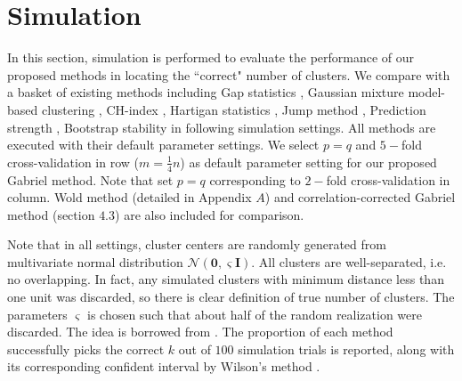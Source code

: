 \documentclass[12pt]{article}
\begin{document}
\section{Simulation}
In this section, simulation is performed to evaluate the performance of our
proposed methods in locating the ``correct" number of clusters. We compare
with a basket of existing methods including Gap statistics
\citep{tibshirani2001estimating}, Gaussian mixture model-based clustering
\citep{fraley2002model}, CH-index \citep{calinski1974dendrite}, Hartigan
statistics \citep{hartigan1975clustering}, Jump method
\citep{sugar2003finding}, Prediction strength \citep{tibshirani2005cluster},
Bootstrap stability \citep{fang2012selection} in following simulation
settings. All methods are executed with their default parameter settings. 
We select $p=q$ and $5-$fold cross-validation in row
($m=\frac{1}{4}n$) as default parameter setting for our proposed Gabriel
method. Note that set $p=q$ corresponding to $2-$fold cross-validation in
column. Wold method (detailed in Appendix $A$) and correlation-corrected 
Gabriel method (section $4.3$) are also included for comparison. 

Note that in all settings, cluster centers are randomly generated from 
multivariate normal distribution $\mathcal{N}\left(\mathbf{0},\varsigma \mathbf{I}\right)$. 
All clusters are well-separated, i.e. no overlapping. In fact, any simulated 
clusters with minimum distance less than one unit was discarded, so there is
clear definition of true number of clusters. The parameters $\varsigma$ is chosen 
such that about half of the random realization were discarded. The idea is borrowed from
\cite{tibshirani2001estimating}. The proportion of each method successfully picks the correct
$k$ out of $100$ simulation trials is reported, along with its corresponding confident interval
by Wilson's method \citep{wilson1927probable}.
\end{document}
